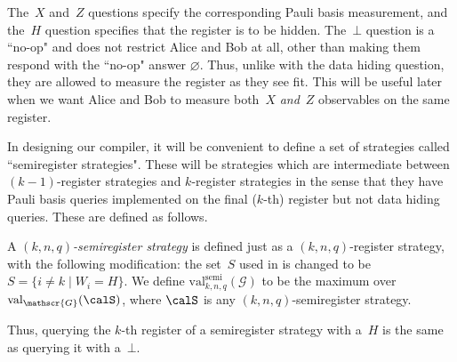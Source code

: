 \documentclass[11pt]{article}
\newcommand{\hideq}{H}
\newcommand{\noop}{\bot}
\newcommand{\game}{\mathscr{G}}
\newcommand{\valstrat}[2]{\mathrm{val}_{#1}(#2)}
\newcommand{\valsemi}[2]{\mathrm{val}_{#1}^{\mathrm{semi}}(#2)}
\begin{document}
The~$X$ and~$Z$ questions specify the corresponding Pauli basis measurement,
and the~$\hideq$ question specifies that the register is to be hidden.
The~$\noop$ question is a ``no-op" and does not restrict Alice and Bob at all, other than making them respond with the ``no-op" answer $\varnothing$.
Thus, unlike with the data hiding question, they are allowed to measure the register as they see fit.
This will be useful later when we want Alice and Bob to measure both~$X$ \emph{and}~$Z$ observables on the same register.

In designing our compiler,
it will be convenient to define a set of strategies called ``semiregister strategies".
These will be strategies which are intermediate between $(k-1)$-register strategies and $k$-register strategies
in the sense that they have Pauli basis queries implemented on the final ($k$-th) register but not data hiding queries.
These are defined as follows.

\begin{definition}
A \emph{$(k, n, q)$-semiregister strategy} is defined just as a $(k, n, q)$-register strategy, with the following modification:
the set~$S$ used in  is changed to be $S = \{i \neq k \mid W_i = \hideq\}$.
We define $\valsemi{k,n,q}{\game}$ to be the maximum over $\valstrat{\game}{\calS}$, where $\calS$ is any $(k, n, q)$-semiregister strategy.
\end{definition}
\noindent
Thus, querying the $k$-th register of a semiregister strategy with
a~$\hideq$ is the same as querying it with a~$\noop$.
\end{document}
